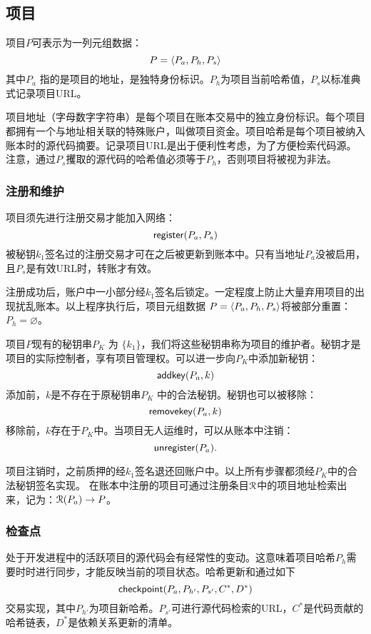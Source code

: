 \subsection{项目}
\label{s:projects}


项目$P$可表示为一列元组数据：
\[
    P = \langle P_a, P_h, P_s\rangle
\]
其中$P_{a}$ 指的是项目的地址，是独特身份标识。$P_h$为项目当前哈希值，$P_s$以标准典式记录项目URL。

项目地址（字母数字字符串）是每个项目在账本交易中的独立身份标识。每个项目都拥有一个与地址相关联的特殊账户，叫做项目资金。项目哈希是每个项目被纳入账本时的源代码摘要。记录项目URL是出于便利性考虑，为了方便检索代码源。注意，通过$P_s$攫取的源代码的哈希值必须等于$P_h$，否则项目将被视为非法。

\subsubsection{注册和维护} 项目须先进行注册交易才能加入网络：
\[
    \mathsf{register}\lparen P_a, P_s\rparen
\]
被秘钥$k_1$签名过的注册交易才可在之后被更新到账本中。只有当地址$P_a$没被启用，且$P_s$是有效URL时，转账才有效。

注册成功后，账户中一小部分\oscoin{}经$k_1$签名后锁定。一定程度上防止大量弃用项目的出现扰乱账本。以上程序执行后，项目元组数据 $P =
\langle P_a, P_h, P_s\rangle$将被部分重置：$P_h = \varnothing$。

项目$P$现有的秘钥串$P_K$ 为 $\{k_1\}$，我们将这些秘钥串称为项目的维护者。秘钥才是项目的实际控制者，享有项目管理权。可以进一步向$P_K$中添加新秘钥：
\[
    \mathsf{addkey}\lparen P_a, k\rparen
\]
添加前，$k$是不存在于原秘钥串$P_K$ 中的合法秘钥。秘钥也可以被移除：
\[
    \mathsf{removekey}\lparen P_a, k\rparen
\]
移除前，$k$存在于$P_K$中。当项目无人运维时，可以从账本中注销：
\[
    \mathsf{unregister}\lparen P_a\rparen.
\]

项目注销时，之前质押的\oscoin{}经$k_1$签名退还回账户中。以上所有步骤都须经$P_K$中的合法秘钥签名实现。
在账本中注册的项目可通过注册条目$\mathcal{R}$中的项目地址检索出来，记为：$\mathcal{R}(P_a) \to P$。

\subsubsection{检查点} \label{s:checkpointing} 处于开发进程中的活跃项目的源代码会有经常性的变动。这意味着项目哈希$P_h$需要时时进行同步，才能反映当前的项目状态。哈希更新和通过如下
\[
    \mathsf{checkpoint}\lparen P_a, P_{h'}, P_{s'}, C^*, D^*\rparen
\]
交易实现，其中$P_{h'}$为项目新哈希。$P_{s'}$可进行源代码检索的URL，$C^*$是代码贡献的哈希链表，$D^*$是依赖关系更新的清单。

